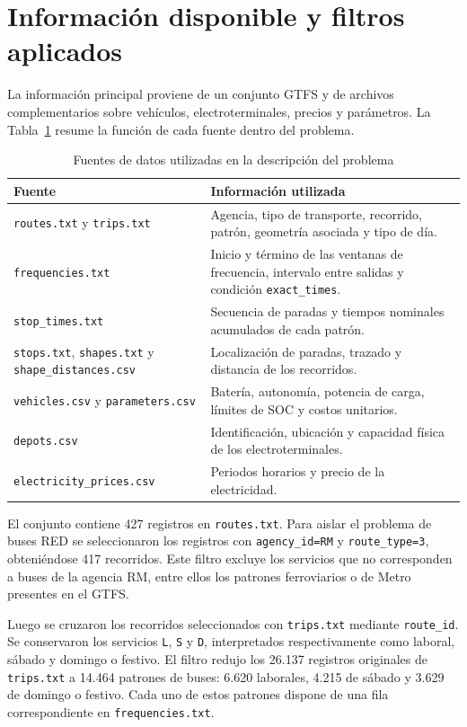 \section{Información disponible y filtros aplicados}

La información principal proviene de un conjunto GTFS y de archivos
complementarios sobre vehículos, electroterminales, precios y parámetros. La
Tabla~\ref{tab:fuentes_datos} resume la función de cada fuente dentro del
problema.

\begin{table}[H]
\centering
\caption{Fuentes de datos utilizadas en la descripción del problema}
\label{tab:fuentes_datos}
\small
\begin{tabular}{p{}p{}}
\toprule
\textbf{Fuente} & \textbf{Información utilizada} \\
\midrule
\texttt{routes.txt} y \texttt{trips.txt} & Agencia, tipo de transporte,
recorrido, patrón, geometría asociada y tipo de día. \\
\texttt{frequencies.txt} & Inicio y término de las ventanas de frecuencia,
intervalo entre salidas y condición \texttt{exact\_times}. \\
\texttt{stop\_times.txt} & Secuencia de paradas y tiempos nominales acumulados
de cada patrón. \\
\texttt{stops.txt}, \texttt{shapes.txt} y
\texttt{shape\_distances.csv} & Localización de paradas, trazado y distancia de
los recorridos. \\
\texttt{vehicles.csv} y \texttt{parameters.csv} & Batería, autonomía,
potencia de carga, límites de SOC y costos unitarios. \\
\texttt{depots.csv} & Identificación, ubicación y capacidad física de los
electroterminales. \\
\texttt{electricity\_prices.csv} & Periodos horarios y precio de la electricidad. \\
\bottomrule
\end{tabular}
\end{table}

El conjunto contiene 427 registros en \texttt{routes.txt}. Para aislar el
problema de buses RED se seleccionaron los registros con
\texttt{agency\_id=RM} y \texttt{route\_type=3}, obteniéndose 417 recorridos.
Este filtro excluye los servicios que no corresponden a buses de la agencia RM,
entre ellos los patrones ferroviarios o de Metro presentes en el GTFS.

Luego se cruzaron los recorridos seleccionados con \texttt{trips.txt} mediante
\texttt{route\_id}. Se conservaron los servicios \texttt{L}, \texttt{S} y
\texttt{D}, interpretados respectivamente como laboral, sábado y domingo o
festivo. El filtro redujo los 26.137 registros originales de
\texttt{trips.txt} a 14.464 patrones de buses: 6.620 laborales, 4.215 de sábado
y 3.629 de domingo o festivo. Cada uno de estos patrones dispone de una fila
correspondiente en \texttt{frequencies.txt}.

